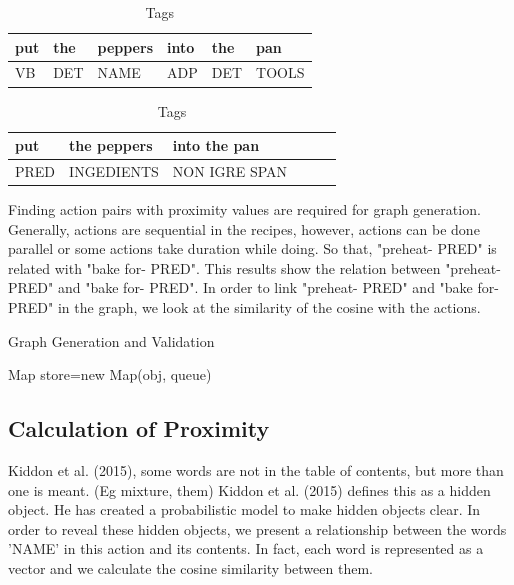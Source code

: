  \begin{table}[]
\centering
\caption{Tags}
\label{my-label}
\begin{tabular}{|l|l|l|l|l|l|}
\hline
put    & the     &  peppers  & into  & the    & pan \\ \hline
VB    & DET   & NAME     & ADP & DET & TOOLS      \\ \hline
\end{tabular}
\end{table}

 \begin{table}[]
\centering
\caption{Tags}
\label{my-label}
\begin{tabular}{|l|l|l|l|l|l|}
\hline
put       &  the peppers       & into  the pan \\ \hline
PRED  & INGEDIENTS & NON IGRE SPAN  \\ \hline
\end{tabular}
\end{table}

Finding action pairs with proximity values are required for graph generation. Generally, actions are sequential in the recipes, however, actions can be done  parallel or some actions take duration while doing. So that, "preheat- PRED" is related with "bake for- PRED". This results show the relation between "preheat- PRED" and "bake for- PRED". In order to link "preheat- PRED"  and  "bake for- PRED" in the graph,  we look at the similarity of the cosine with the actions. 


\begin{algorithm}
\caption{Graph Generation and Validation}
\label{alg:generateGraph}

Map store=new Map(obj, queue)\;
\end{algorithm}





\subsection{Calculation of Proximity}
Kiddon et al. (2015), some words are not in the table of contents, but more than one is meant. (Eg mixture, them) Kiddon et al. (2015) defines this as a hidden object. He has created a probabilistic model to make hidden objects clear. In order to reveal these hidden objects, we present a relationship between the words 'NAME' in this action and its contents. In fact, each word is represented as a vector and we calculate the cosine similarity between them.

